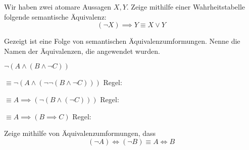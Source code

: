 \documentclass{uebungsblatt}
\begin{document}
\begin{exercise}
    Wir haben zwei atomare Aussagen $X,Y$. Zeige mithilfe einer Wahrheitstabelle folgende semantische Äquivalenz: \[ (\lnot X) \implies Y \equiv X \lor Y\] 
    
    \begin{answerbox}[1in]
    \end{answerbox}
\end{exercise}

\begin{exercise}

    Gezeigt ist eine Folge von semantischen Äquivalenzumformungen. Nenne die Namen der Äquivalenzen,
    die angewendet wurden.
        \\
        \begin{center}
        $\lnot (A \land (B \land \lnot C))$

         $\equiv \lnot (A \land (\lnot \lnot (B \land \lnot C)))$ Regel: 

       $\equiv A \implies (\lnot (B \land (\lnot C)))$ Regel: 

        $\equiv A \implies (B \implies C)$ Regel: 
        \end{center}
    

\end{exercise}

\begin{exercise}
    Zeige mithilfe von Äquivalenzumformungen, dass
    \[ (\lnot A) \iff (\lnot B) \equiv A \iff B\]
    \begin{answerbox}[1in]
    \end{answerbox}
\end{exercise}
\end{document}
